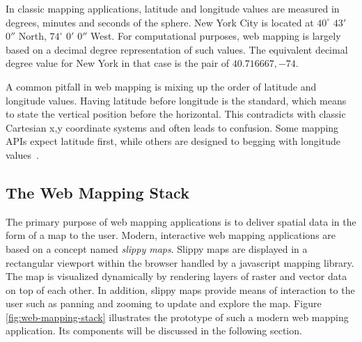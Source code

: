 In classic mapping applications, latitude and longitude values are measured in degrees, minutes and seconds of the sphere. New York City is located at $40^\circ$ $43'$ $0''$ North, $74^\circ$ $0'$ $0''$ West. For computational purposes, web mapping is largely based on a decimal degree representation of such values. The equivalent decimal degree value for New York in that case is the pair of $40.716667, -74$.

A common pitfall in web mapping is mixing up the order of latitude and longitude values. Having latitude before longitude is the standard, which means to state the vertical position before the horizontal. This contradicts with classic Cartesian x,y coordinate systems and often leads to confusion. Some mapping APIs expect latitude first, while others are designed to begging with longitude values~\cite{Zzolo11mappingdrupal}. 


\subsection{The Web Mapping Stack}

The primary purpose of web mapping applications is to deliver spatial data in the form of a map to the user. Modern, interactive web mapping applications are based on a concept named \textit{slippy maps}. Slippy maps are displayed in a rectangular viewport within the browser handled by a javascript mapping library. The map is visualized dynamically by rendering layers of raster and vector data on top of each other. In addition, slippy maps provide means of interaction to the user such as panning and zooming to update and explore the map. Figure \ref{fig:web-mapping-stack} illustrates the prototype of such a modern web mapping application. Its components will be discussed in the following section.

